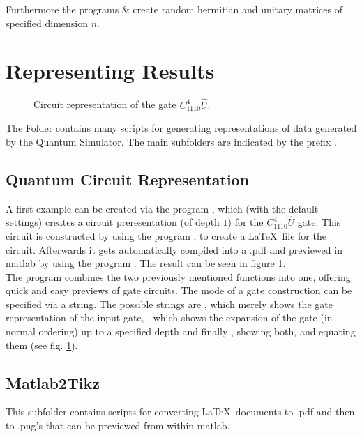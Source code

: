 
Furthermore the programs  \&  create random hermitian and unitary matrices of specified dimension $n$.  

\section{Representing Results}
\begin{figure}[htb]
 \centering
  \hspace{0.2cm}
  \caption{\label{fig:circ_c4u} Circuit representation of the gate $C^4_{1110}\hat{U}$. }
\end{figure}
The Folder  contains many scripts for generating representations of data generated by the Quantum Simulator. The main subfolders are indicated by the prefix .
\subsection{Quantum Circuit Representation}
A first example can be created via the program , which (with the default settings) creates a circuit preresentation (of depth $1$) for the $C^4_{1110}\hat{U}$ gate. This circuit is constructed by using the program , to create a \LaTeX\, file for the circuit. Afterwards it gets automatically compiled into a .pdf and previewed in matlab by using the program . The result can be seen in figure \ref{fig:circ_c4u}.\\

The program  combines the two previously mentioned functions into one, offering quick and easy previews of gate circuits. The mode of a gate construction can be specified via a string. The possible strings are , which merely shows the gate representation of the input gate, , which shows the expansion of the gate (in normal ordering) up to a specified depth and finally , showing both, and equating them (see fig. \ref{fig:circ_c4u}). 
\subsection{Matlab2Tikz}
This subfolder contains scripts for converting \LaTeX\, documents to .pdf and then to .png's that can be previewed from within matlab.
